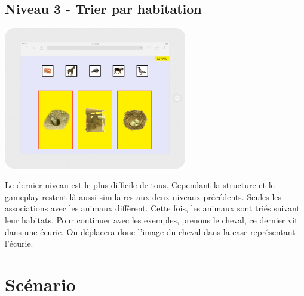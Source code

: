 \documentclass{article}
\begin{document}
\subsection{Niveau 3 - Trier par habitation}
\vspace{0.5cm}
\begin{center}
\includegraphics[width=0.6\textwidth]{page4}
\end{center}
\vspace{0.5cm}
\hspace*{0.6cm}Le dernier niveau est le plus difficile de tous. Cependant la structure et le gameplay restent l\`a aussi similaires aux deux niveaux pr\'ec\'edents. Seules les associations avec les animaux diff\`erent. Cette fois, les animaux sont tri\'es suivant leur habitats. Pour continuer avec les exemples, prenons le cheval, ce dernier vit dans une \'ecurie. On d\'eplacera donc l'image du cheval dans la case repr\'esentant l'\'ecurie.
    
\section{Sc\'enario}
\end{document}
